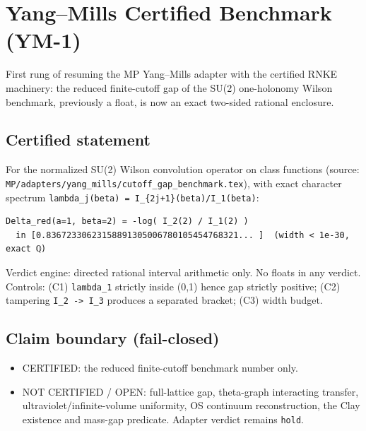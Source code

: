 \hypertarget{yangmills-certified-benchmark-ym-1}{%
\chapter{Yang--Mills Certified Benchmark (YM-1)}\label{yangmills-certified-benchmark-ym-1}}

First rung of resuming the MP Yang--Mills adapter with the certified RNKE
machinery: the reduced finite-cutoff gap of the SU(2) one-holonomy Wilson
benchmark, previously a float, is now an exact two-sided rational enclosure.

\hypertarget{certified-statement}{%
\section{Certified statement}\label{certified-statement}}

For the normalized SU(2) Wilson convolution operator on class functions
(source: \texttt{MP/adapters/yang\_mills/cutoff\_gap\_benchmark.tex}), with exact
character spectrum \texttt{lambda\_j(beta)\ =\ I\_\{2j+1\}(beta)/I\_1(beta)}:

\begin{verbatim}
Delta_red(a=1, beta=2) = -log( I_2(2) / I_1(2) )
  in [0.83672330623158891305006780105454768321... ]  (width < 1e-30, exact ℚ)
\end{verbatim}

Verdict engine: directed rational interval arithmetic only. No floats in any
verdict. Controls: (C1) \texttt{lambda\_1} strictly inside (0,1) hence gap strictly
positive; (C2) tampering \texttt{I\_2\ -\textgreater{}\ I\_3} produces a separated bracket; (C3)
width budget.

\hypertarget{claim-boundary-fail-closed}{%
\section{Claim boundary (fail-closed)}\label{claim-boundary-fail-closed}}

\begin{itemize}
\tightlist
\item
  CERTIFIED: the reduced finite-cutoff benchmark number only.
\item
  NOT CERTIFIED / OPEN: full-lattice gap, theta-graph interacting transfer,
  ultraviolet/infinite-volume uniformity, OS continuum reconstruction, the
  Clay existence and mass-gap predicate. Adapter verdict remains \texttt{hold}.
\end{itemize}

